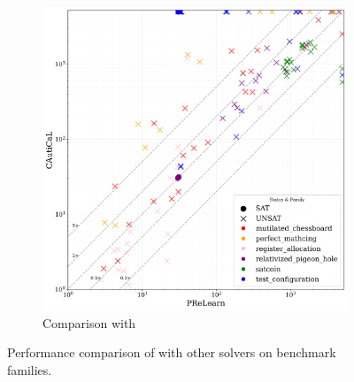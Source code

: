 \begin{figure}[!t]
    \begin{subfigure}[t]{0.45\textwidth}
        \centering
        \includegraphics[width=\textwidth]{figs/prelearn_vs_cautical_interesting_legend.jpg}
        \caption{Comparison with \prelearn}
        \label{fig:cautical-vs-prelearn}
    \end{subfigure}

    \caption{Performance comparison of \tool with other solvers on benchmark families.}
    \label{fig:solver-comparison-familis}
\end{figure}












